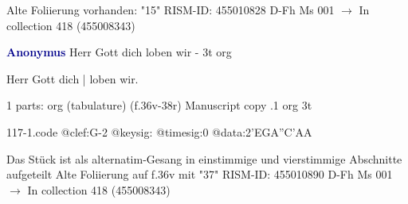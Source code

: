 \documentclass[twocolumn]{book}
\begin{document}
\newline Alte Foliierung vorhanden: "15"
\newline RISM-ID: 455010828
\newline D-Fh  Ms 001
\newline $\rightarrow$ In collection 418 (455008343)
      
\newline \par \vspace{7pt} \textcolor{darkblue}{\textbf{Anonymus  }}
\newline Herr Gott dich loben wir - 3t
\newline org
\newline \begin{itshape}[f.36v, at left:] Herr Gott dich | loben wir.\end{itshape} 
\newline \textcolor{darkblue}{}  1 parts: org (tabulature)  (f.36v-38r)
\newline Manuscript copy
.1  org  3t  
\begin{filecontents*}{117-1.code}
@clef:G-2
@keysig:
@timesig:0
@data:2'EGA''C'AA
\end{filecontents*}
\newline
%

\newline Das Stück ist als alternatim-Gesang in einstimmige und vierstimmige Abschnitte aufgeteilt
\newline Alte Foliierung auf f.36v mit "37"
\newline RISM-ID: 455010890
\newline D-Fh  Ms 001
\newline $\rightarrow$ In collection 418 (455008343)
      
\end{document}
